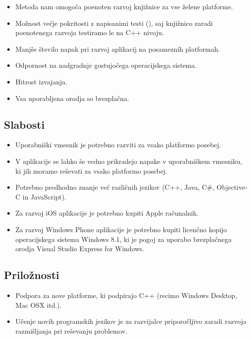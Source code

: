 \begin{itemize}
  \item Metoda nam omogoča poenoten razvoj knjižnice za vse želene platforme.
  \item Možnost večje pokritosti z napisanimi testi (), saj knjižnico zaradi poenotenega razvoja testiramo le na C++ nivoju.
  \item Manjše število napak pri razvoj aplikacij na posameznih platformah.
  \item Odpornost na nadgradnje gostujočega operacijskega sistema.
  \item Hitrost izvajanja.
  \item Vsa uporabljena orodja so brezplačna.
\end{itemize}

\subsection{Slabosti}

\begin{itemize}
  \item Uporabniški vmesnik je potrebno razviti za vsako platformo posebej.
  \item V aplikacije se lahko še vedno prikradejo napake v uporabniškem vmesniku, ki jih moramo reševati za vsako platformo posebej.
  \item Potrebno predhodno znanje več različnih jezikov (C++, Java, C\#, Objective-C in JavaScript).
  \item Za razvoj iOS aplikacije je potrebno kupiti Apple računalnik.
  \item Za razvoj Windows Phone aplikacije je potrebno kupiti licenčno kopijo operacijskega sistema Windows 8.1, ki je pogoj za uporabo brezplačnega orodja Visual Studio Express for Windows\cite{visual-studio-express}.
\end{itemize}

\subsection{Priložnosti}

\begin{itemize}
  \item Podpora za nove platforme, ki podpirajo C++ (recimo Windows Desktop, Mac OSX itd.).
  \item Učenje novih programskih jezikov je za razvijalce priporočljivo zaradi razvoja razmišljanja pri reševanju problemov\cite{pragprog}.
\end{itemize}

